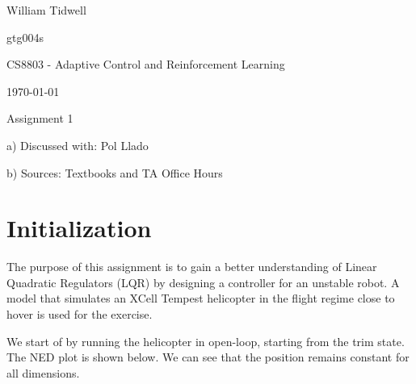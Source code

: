 \documentclass{article}
\begin{document}
\begin{flushright}
William Tidwell \par
gtg004s \par
CS8803 - Adaptive Control and Reinforcement Learning \par
\today \par
\end{flushright}

\begin{center}
Assignment 1
\end{center}

\begin{flushleft}
a) Discussed with: Pol Llado\par
b) Sources: Textbooks and TA Office Hours \par
\end{flushleft}

\section{Initialization}
The purpose of this assignment is to gain a better understanding of Linear Quadratic Regulators (LQR) by designing a controller for an unstable robot. A model that simulates an XCell Tempest helicopter in the flight regime close to hover is used for the exercise. 

We start of by running the helicopter in open-loop, starting from the trim state. The NED plot is shown below. We can see that the position remains constant for all dimensions.
\end{document}
